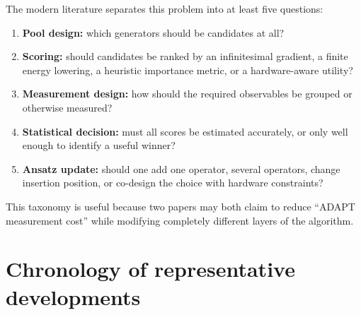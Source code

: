 \documentclass[11pt]{article}
\begin{document}
The modern literature separates this problem into at least five questions:
\begin{enumerate}[leftmargin=2em]
    \item \textbf{Pool design:} which generators should be candidates at all?
    \item \textbf{Scoring:} should candidates be ranked by an infinitesimal gradient, a finite energy lowering, a heuristic importance metric, or a hardware-aware utility?
    \item \textbf{Measurement design:} how should the required observables be grouped or otherwise measured?
    \item \textbf{Statistical decision:} must all scores be estimated accurately, or only well enough to identify a useful winner?
    \item \textbf{Ansatz update:} should one add one operator, several operators, change insertion position, or co-design the choice with hardware constraints?
\end{enumerate}
This taxonomy is useful because two papers may both claim to reduce ``ADAPT measurement cost'' while modifying completely different layers of the algorithm.

\section{Chronology of representative developments}
\end{document}

